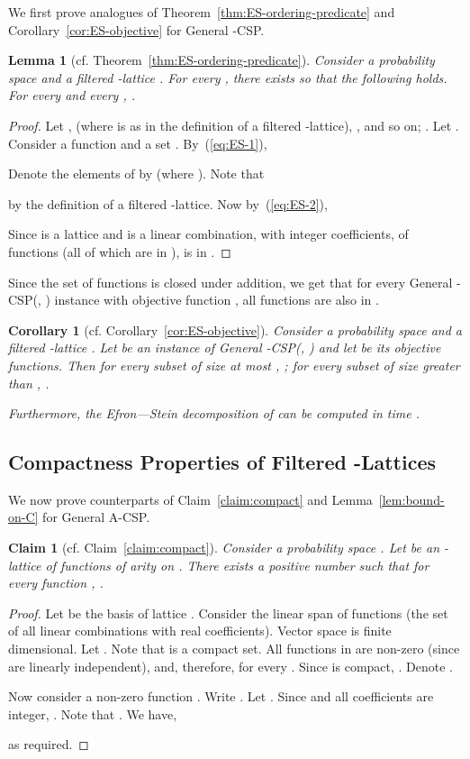 \documentclass[11pt]{article}
\newtheorem{lemma}[theorem]{Lemma}
\newtheorem{claim}[theorem]{Claim}
\newtheorem{corollary}[theorem]{Corollary}
\begin{document}
We first prove analogues of Theorem~\ref{thm:ES-ordering-predicate} and Corollary~\ref{cor:ES-objective} for General -CSP.
\begin{lemma}[cf. Theorem~\ref{thm:ES-ordering-predicate}]\label{lem:ES-general-predicate}
Consider a probability space  and a filtered -lattice .
For every , there exists  so that the following holds. For every  and every ,
.
\end{lemma}
\begin{proof}
Let ,  (where  is as in the definition of a filtered -lattice), , and so on;
. Let .
Consider a function  and a set . By~(\ref{eq:ES-1}),

Denote the elements of  by  (where ). Note that

by the definition of a filtered -lattice.
Now by~(\ref{eq:ES-2}),

Since  is a lattice and  is a linear combination, with integer coefficients, of functions  (all of which are in ),
 is in .
\end{proof}
Since the set of functions  is closed under addition, we get that for every General -CSP(, ) instance  with objective
function , all functions  are also in .
\begin{corollary}[cf. Corollary~\ref{cor:ES-objective}]
Consider a probability space  and a filtered -lattice .
Let  be an instance of General -CSP(, ) and let  be its objective functions.
Then for every subset  of size at most , ;
for every subset  of size greater than , .

Furthermore, the Efron---Stein decomposition  of  can be computed in time .
\end{corollary}
\subsection{Compactness Properties of Filtered -Lattices}
We now prove counterparts of Claim~\ref{claim:compact} and Lemma~\ref{lem:bound-on-C} for General A-CSP.
\begin{claim}[cf. Claim~\ref{claim:compact}]\label{claim:compact-A-CSP}
Consider a probability space . Let  be an -lattice of functions of arity  on .
There exists a positive number  such that for every function , .
\end{claim}
\begin{proof}
Let  be the basis of lattice . Consider the linear span  of functions  (the set of all linear combinations with real coefficients).
Vector space  is finite dimensional. Let . Note that  is a compact set. All functions in  are non-zero (since
 are linearly independent),
and, therefore,  for every . Since  is compact,  . Denote .

Now consider a non-zero function . Write . Let . Since  and all coefficients  are integer, .
Note that . We have,

as required.
\end{proof}
\end{document}
